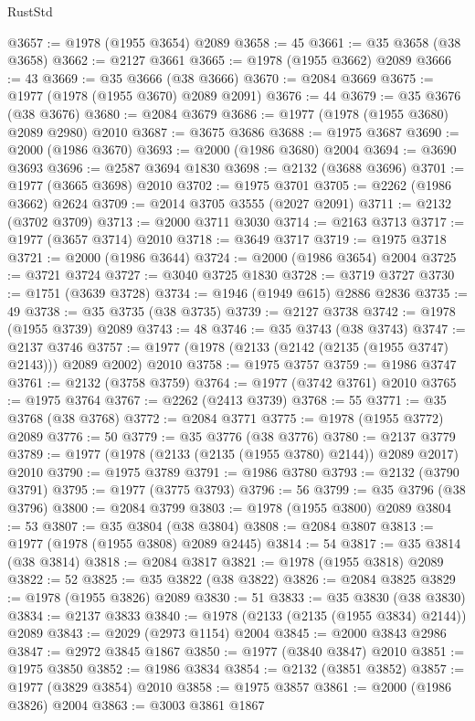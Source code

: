\begin{lexlean}{RustStd}
\begin{coremodule}
@3657 := @1978 (@1955 @3654) @2089
@3658 := 45
@3661 := @35 @3658 (@38 @3658)
@3662 := @2127 @3661
@3665 := @1978 (@1955 @3662) @2089
@3666 := 43
@3669 := @35 @3666 (@38 @3666)
@3670 := @2084 @3669
@3675 := @1977 (@1978 (@1955 @3670) @2089 @2091)
@3676 := 44
@3679 := @35 @3676 (@38 @3676)
@3680 := @2084 @3679
@3686 := @1977 (@1978 (@1955 @3680) @2089 @2980) @2010
@3687 := @3675 @3686
@3688 := @1975 @3687
@3690 := @2000 (@1986 @3670)
@3693 := @2000 (@1986 @3680) @2004
@3694 := @3690 @3693
@3696 := @2587 @3694 @1830
@3698 := @2132 (@3688 @3696)
@3701 := @1977 (@3665 @3698) @2010
@3702 := @1975 @3701
@3705 := @2262 (@1986 @3662) @2624
@3709 := @2014 @3705 @3555 (@2027 @2091)
@3711 := @2132 (@3702 @3709)
@3713 := @2000 @3711 @3030
@3714 := @2163 @3713
@3717 := @1977 (@3657 @3714) @2010
@3718 := @3649 @3717
@3719 := @1975 @3718
@3721 := @2000 (@1986 @3644)
@3724 := @2000 (@1986 @3654) @2004
@3725 := @3721 @3724
@3727 := @3040 @3725 @1830
@3728 := @3719 @3727
@3730 := @1751 (@3639 @3728)
@3734 := @1946 (@1949 @615) @2886 @2836
@3735 := 49
@3738 := @35 @3735 (@38 @3735)
@3739 := @2127 @3738
@3742 := @1978 (@1955 @3739) @2089
@3743 := 48
@3746 := @35 @3743 (@38 @3743)
@3747 := @2137 @3746
@3757 := @1977 (@1978 (@2133 (@2142 (@2135 (@1955 @3747) @2143))) @2089 @2002) @2010
@3758 := @1975 @3757
@3759 := @1986 @3747
@3761 := @2132 (@3758 @3759)
@3764 := @1977 (@3742 @3761) @2010
@3765 := @1975 @3764
@3767 := @2262 (@2413 @3739)
@3768 := 55
@3771 := @35 @3768 (@38 @3768)
@3772 := @2084 @3771
@3775 := @1978 (@1955 @3772) @2089
@3776 := 50
@3779 := @35 @3776 (@38 @3776)
@3780 := @2137 @3779
@3789 := @1977 (@1978 (@2133 (@2135 (@1955 @3780) @2144)) @2089 @2017) @2010
@3790 := @1975 @3789
@3791 := @1986 @3780
@3793 := @2132 (@3790 @3791)
@3795 := @1977 (@3775 @3793)
@3796 := 56
@3799 := @35 @3796 (@38 @3796)
@3800 := @2084 @3799
@3803 := @1978 (@1955 @3800) @2089
@3804 := 53
@3807 := @35 @3804 (@38 @3804)
@3808 := @2084 @3807
@3813 := @1977 (@1978 (@1955 @3808) @2089 @2445)
@3814 := 54
@3817 := @35 @3814 (@38 @3814)
@3818 := @2084 @3817
@3821 := @1978 (@1955 @3818) @2089
@3822 := 52
@3825 := @35 @3822 (@38 @3822)
@3826 := @2084 @3825
@3829 := @1978 (@1955 @3826) @2089
@3830 := 51
@3833 := @35 @3830 (@38 @3830)
@3834 := @2137 @3833
@3840 := @1978 (@2133 (@2135 (@1955 @3834) @2144)) @2089
@3843 := @2029 (@2973 @1154) @2004
@3845 := @2000 @3843 @2986
@3847 := @2972 @3845 @1867
@3850 := @1977 (@3840 @3847) @2010
@3851 := @1975 @3850
@3852 := @1986 @3834
@3854 := @2132 (@3851 @3852)
@3857 := @1977 (@3829 @3854) @2010
@3858 := @1975 @3857
@3861 := @2000 (@1986 @3826) @2004
@3863 := @3003 @3861 @1867

\end{coremodule}
\end{lexlean}
